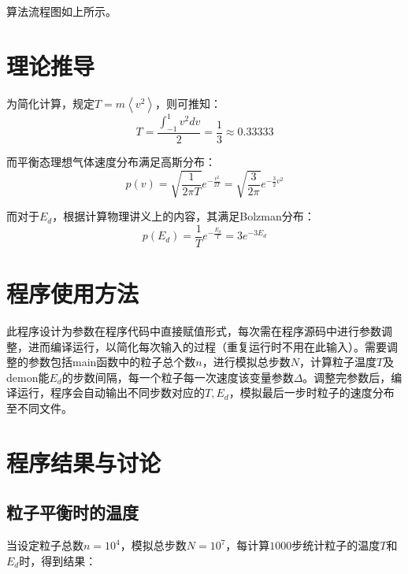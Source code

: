 \documentclass[a4paper,11pt]{article}
\begin{document}
算法流程图如上所示。

\section{理论推导}
为简化计算，规定$T = m \left < v^{2} \right>$，则可推知：
\begin{equation}
	T = \frac{\int_{-1}^{1} v^{2} dv}{2} = \frac{1}{3} \approx 0.33333
\end{equation}

而平衡态理想气体速度分布满足高斯分布：
\begin{equation}
	p(v) = \sqrt{\frac{1}{2\pi T}} e^{-\frac{v^{2}}{2T}} = \sqrt{\frac{3}{2\pi}} e^{-\frac{3}{2}v^{2}}
\end{equation}

而对于$E_{d}$，根据计算物理讲义上的内容，其满足Bolzman分布：
\begin{equation}
	p(E_{d}) = \frac{1}{T} e^{-\frac{E_{d}}{T}} = 3e^{-3E_{d}}
\end{equation}

\section{程序使用方法}
此程序设计为参数在程序代码中直接赋值形式，每次需在程序源码中进行参数调整，进而编译运行，以简化每次输入的过程（重复运行时不用在此输入）。需要调整的参数包括main函数中的粒子总个数$n$，进行模拟总步数$N$，计算粒子温度$T$及demon能$E_{d}$的步数间隔，每一个粒子每一次速度该变量参数$\Delta$。调整完参数后，编译运行，程序会自动输出不同步数对应的$T,E_{d}$，模拟最后一步时粒子的速度分布至不同文件。

\newpage
\section{程序结果与讨论}
\subsection{粒子平衡时的温度}
当设定粒子总数$n=10^{4}$，模拟总步数$N=10^{7}$，每计算$1000$步统计粒子的温度$T$和$E_{d}$时，得到结果：
\end{document}
